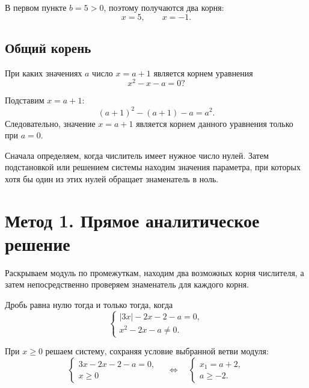 В первом пункте \(b=5>0\), поэтому получаются два корня:
\[
  x=5,
  \qquad
  x=-1.
\]

\subsection{Общий корень}

\begin{trainingtask}
  При каких значениях \(a\) число \(x=a+1\) является корнем уравнения
  \[
    x^2-x-a=0?
  \]
\end{trainingtask}

Подставим \(x=a+1\):
\[
  (a+1)^2-(a+1)-a=a^2.
\]
Следовательно, значение \(x=a+1\) является корнем данного уравнения только
при \(a=0\).

\begin{conclusionbox}
  Сначала определяем, когда числитель имеет нужное число нулей. Затем
  подстановкой или решением системы находим значения параметра, при которых
  хотя бы один из этих нулей обращает знаменатель в ноль.
\end{conclusionbox}

\section{Метод 1. Прямое аналитическое решение}

\begin{methodintro}
  Раскрываем модуль по промежуткам, находим два возможных корня числителя,
  а затем непосредственно проверяем знаменатель для каждого корня.
\end{methodintro}

Дробь равна нулю тогда и только тогда, когда
\[
  \begin{cases}
    |3x|-2x-2-a=0,\\
    x^2-2x-a\ne 0.
  \end{cases}
\]


При \(x\ge 0\) решаем систему, сохраняя условие выбранной ветви модуля:
\[
  \begin{cases}
    3x-2x-2-a=0,\\
    x\ge 0
  \end{cases}
  \quad\Longleftrightarrow\quad
  \begin{cases}
    x_1=a+2,\\
    a\ge -2.
  \end{cases}
\]

